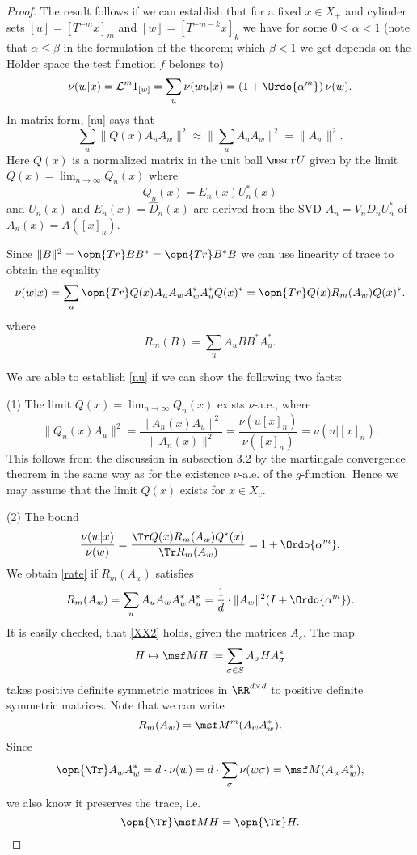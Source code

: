 \documentclass[11pt]{scrartcl}
\theoremstyle{plain} %
\theoremstyle{definition}
\begin{document}
\begin{proof}
The result follows if we can establish that for a fixed $x\in X_+$ and cylinder sets $[u]=[T^{-m} x]_m$ and $[w]=[T^{-m-k} x]_k$ we have for some $0<\alpha<1$ (note that $\alpha\leq \beta$ in the formulation of the theorem; which $\beta<1$ we get depends on the H\"older space the test function $f$ belongs to)
\begin{equation}\label{nu}
\nu(w|x)={\mathcal L}^m 1_{[w]}=\sum_u \nu(wu|x)=\left(1+\Ordo {\alpha^m}\right)\nu(w).
\end{equation} 
In matrix form, \eqref{nu} says that
\begin{equation}\label{XXX}
   \sum_u \| Q(x) A_u A_w \|^2 \approx \| \sum_u A_u A_w \|^2 = \| A_w \|^2.
\end{equation}
Here $Q(x)$ is a normalized matrix in the unit ball $\mscr U$ given by
the limit $Q(x)=\lim_{n\to\infty} Q_n(x)$ where 
$$ Q_n(x)=E_n(x)U_n^*(x) $$
and $U_n(x)$ and $E_n(x)=\hat D_n(x)$ are derived from the SVD $A_n=V_n D_n U^*_n$ of
$A_n(x)=A([x]_n)$.

Since $\| B \|^2 = \opn{Tr} B B^* = \opn{Tr} B^* B$ we can use linearity of trace
to obtain the equality
\begin{equation} \label{XX1}
  \nu(w|x) = \sum_u \opn{Tr} Q(x) A_u A_w A_w^* A_u^* Q(x)^*
  = \opn{Tr} Q(x) R_m(A_w) Q(x)^*. 
\end{equation}
where 
$$ R_m(B) =  \sum_u A_u B B^* A_u^*. $$

We are able to establish \eqref{nu} if we can show the following two facts:

(1) The limit $Q(x)=\lim_{n\to \infty} Q_n(x)$ exists $\nu$-a.e., where
$$\|Q_n(x)A_u\|^2=\frac{\|A_n(x)A_u\|^2}{\|A_n(x)\|^2}=\frac{\nu(u[x]_n)}{\nu([x]_n)}=\nu(u|[x]_n).$$
This follows from the discussion in subsection 3.2 by the martingale convergence theorem in the same way as for the existence $\nu$-a.e. of the $g$-function. Hence we may assume that the limit $Q(x)$ exists for $x\in X_c$.

(2) The bound 
\begin{equation}\label{rate}
\frac{\nu(w|x)}{\nu(w)}=\frac{\Tr Q(x)R_m(A_w)Q^*(x)}{\Tr R_m(A_w)}=1+\Ordo{\alpha^m}.
\end{equation}
We obtain \eqref{rate} if $R_m(A_w)$ satisfies 
\begin{equation}\label{XX2}
  R_m(A_w) = \sum_u A_u A_w A_w^* A_u^* = \frac1d \cdot \| A_w \|^2 (I+\Ordo{\alpha^m}).
\end{equation}
It is easily checked, that \eqref{XX2} holds, given the matrices $A_s$. The map
$$ H \mapsto \msf M H := \sum_{\sigma\in S} A_\sigma H A_\sigma^* $$
takes positive definite symmetric matrices in $\RR^{d\times d}$ to
positive definite symmetric matrices. 
Note that we can write
$$ R_m(A_w) = \msf M^m (A_w A_w^*). $$
Since
$$\opn{\Tr} A_wA^*_w = d\cdot \nu(w) = d\cdot \sum_\sigma \nu(w\sigma) = \msf M (A_wA_w^*), $$ 
we also know it preserves the trace, i.e.\ 
$$\opn{\Tr} \msf M H = \opn{\Tr} H. $$ 


\end{proof}
\end{document}
